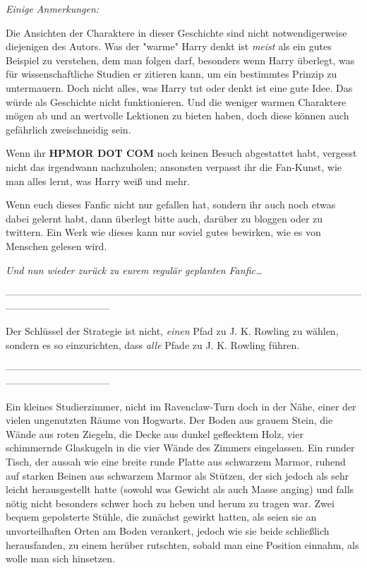 {\emph{Einige Anmerkungen:}

Die Ansichten der Charaktere in dieser Geschichte sind nicht notwendigerweise diejenigen des Autors. Was der "warme" Harry denkt ist \emph{meist} als ein gutes Beispiel zu verstehen, dem man folgen darf, besonders wenn Harry überlegt, was für wissenschaftliche Studien er zitieren kann, um ein bestimmtes Prinzip zu untermauern. Doch nicht alles, was Harry tut oder denkt ist eine gute Idee. Das würde als Geschichte nicht funktionieren. Und die weniger warmen Charaktere mögen ab und an wertvolle Lektionen zu bieten haben, doch diese können auch gefährlich zweischneidig sein.

Wenn ihr \textbf{HPMOR DOT COM} noch keinen Besuch abgestattet habt, vergesst nicht das irgendwann nachzuholen; ansonsten verpasst ihr die Fan-Kunst, wie man alles lernt, was Harry weiß und mehr.

Wenn euch dieses Fanfic nicht nur gefallen hat, sondern ihr auch noch etwas dabei gelernt habt, dann überlegt bitte auch, darüber zu bloggen oder zu twittern. Ein Werk wie dieses kann nur soviel gutes bewirken, wie es von Menschen gelesen wird.

\emph{Und nun wieder zurück zu eurem regulär geplanten Fanfic…}

--------------------------------------------------------------------------------------------------------------------------------------------

Der Schlüssel der Strategie ist nicht, \emph{einen} Pfad zu J. K. Rowling zu wählen, sondern es so einzurichten, dass \emph{alle} Pfade zu J. K. Rowling führen.

--------------------------------------------------------------------------------------------------------------------------------------------

Ein kleines Studierzimmer, nicht im Ravenclaw-Turn doch in der Nähe, einer der vielen ungenutzten Räume von Hogwarts. Der Boden aus grauem Stein, die Wände aus roten Ziegeln, die Decke aus dunkel geflecktem Holz, vier schimmernde Glaskugeln in die vier Wände des Zimmers eingelassen. Ein runder Tisch, der aussah wie eine breite runde Platte aus schwarzem Marmor, ruhend auf starken Beinen aus schwarzem Marmor als Stützen, der sich jedoch als sehr leicht herausgestellt hatte (sowohl was Gewicht als auch Masse anging) und falls nötig nicht besonders schwer hoch zu heben und herum zu tragen war. Zwei bequem gepolsterte Stühle, die zunächst gewirkt hatten, als seien sie an unvorteilhaften Orten am Boden verankert, jedoch wie sie beide schließlich herausfanden, zu einem herüber rutschten, sobald man eine Position einnahm, als wolle man sich hinsetzen.

}
